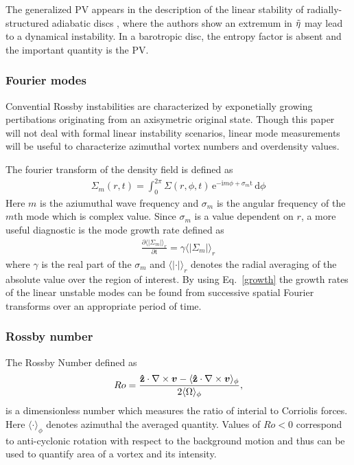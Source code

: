 The generalized PV appears in the description of the linear stability
of radially-structured adiabatic discs \citep{lovelace99,li00}, where
the authors show an extremum in $\tilde{\eta}$ may lead to a dynamical
instability. In a barotropic disc, the entropy factor is absent
and the important quantity is the PV. 

\subsubsection{Fourier modes}
Convential Rossby instabilities are characterized by exponetially growing pertibations originating from an axisymetric original state. Though this paper will not deal with formal linear instability scenarios, linear mode measurements will be useful to characterize azimuthal vortex numbers and overdensity values.

The fourier transform of the density field is defined as
\begin{align}\label{fouriertransform}
  \Sigma_m(r,t) = \int_{0}^{2\pi} \Sigma(r,\phi,t) \, \mathrm{e}^{-\mathrm{i}m\phi+\sigma_m \mathrm{t}} \, \mathrm{d}\phi
\end{align}
Here $m$ is the aziumuthal wave frequency and $\sigma_m$ is the angular frequency of the $m \mathrm{th}$ mode which is complex value. Since $\sigma_m$ is a value dependent on $r$, a more useful diagnostic is the mode growth rate defined as 
\begin{align}\label{growth}
  \frac{\partial \langle|\Sigma_m|\rangle_r }{\partial \mathrm{t}}= \gamma \langle|\Sigma_m|\rangle_r 
\end{align}
where $\gamma$ is the real part of the $\sigma_m$ and $\langle|\cdot|\rangle_r$ denotes the radial averaging of the absolute value over the region of interest. By using Eq.~\ref{growth} the growth rates of the linear unstable modes can be found from successive spatial Fourier transforms over an appropriate period of time.

\subsubsection{Rossby number}
The Rossby Number defined as
\begin{align}
  Ro = \frac{{\bf \hat{z}} \cdot \nabla \times \bm{v} - \langle {\bf\hat{z}} \cdot \nabla \times \bm{v} \rangle_{\phi}}{2\langle\Omega\rangle_{\phi}}, 
\end{align}
is a dimensionless number which measures the ratio of interial to Corriolis forces. Here $\langle \cdot \rangle_{\phi}$ denotes azimuthal the averaged quantity. Values of $Ro<0$ correspond to anti-cyclonic rotation with respect to the background motion and thus can be used to quantify area of a vortex and its intensity.

